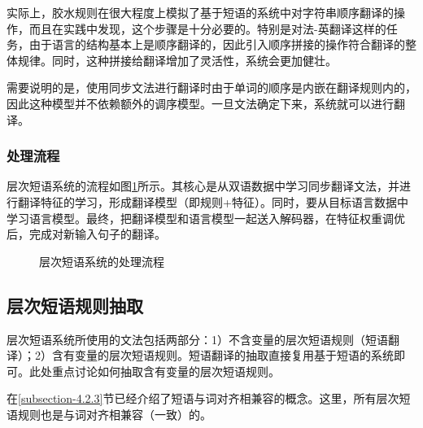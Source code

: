 \parinterval 实际上，胶水规则在很大程度上模拟了基于短语的系统中对字符串顺序翻译的操作，而且在实践中发现，这个步骤是十分必要的。特别是对法-英翻译这样的任务，由于语言的结构基本上是顺序翻译的，因此引入顺序拼接的操作符合翻译的整体规律。同时，这种拼接给翻译增加了灵活性，系统会更加健壮。

\parinterval 需要说明的是，使用同步文法进行翻译时由于单词的顺序是内嵌在翻译规则内的，因此这种模型并不依赖额外的调序模型。一旦文法确定下来，系统就可以进行翻译。


\subsubsection{处理流程}

\parinterval 层次短语系统的流程如图\ref{fig:4-33}所示。其核心是从双语数据中学习同步翻译文法，并进行翻译特征的学习，形成翻译模型（即规则+特征）。同时，要从目标语言数据中学习语言模型。最终，把翻译模型和语言模型一起送入解码器，在特征权重调优后，完成对新输入句子的翻译。

\begin{figure}[htp]
\centering

\caption{层次短语系统的处理流程}
\label{fig:4-33}
\end{figure}


\subsection{层次短语规则抽取}

\parinterval 层次短语系统所使用的文法包括两部分：1）不含变量的层次短语规则（短语翻译）；2）含有变量的层次短语规则。短语翻译的抽取直接复用基于短语的系统即可。此处重点讨论如何抽取含有变量的层次短语规则。

\parinterval 在\ref{subsection-4.2.3}节已经介绍了短语与词对齐相兼容的概念。这里，所有层次短语规则也是与词对齐相兼容（一致）的。

